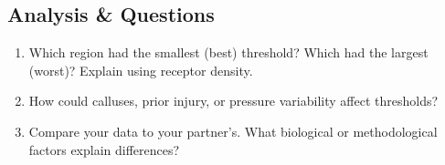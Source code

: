 \begin{Form}
\section{Analysis \& Questions}
\begin{enumerate}[leftmargin=*]
  \item Which region had the smallest (best) threshold? Which had the largest (worst)? Explain using receptor density.\\[0.5em]
  \TextField[multiline=true,name=q1,width=\textwidth,height=3cm]{}

  \item How could calluses, prior injury, or pressure variability affect thresholds?\\[0.5em]
  \TextField[multiline=true,name=q2,width=\textwidth,height=3cm]{}

  \item Compare your data to your partner’s. What biological or methodological factors explain differences?\\[0.5em]
  \TextField[multiline=true,name=q3,width=\textwidth,height=3cm]{}
\end{enumerate}

\end{Form}
